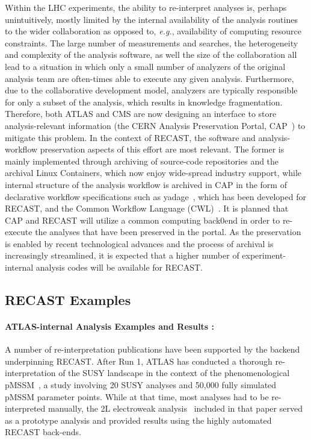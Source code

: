 Within the LHC experiments, the ability to re-interpret analyses is, perhaps unintuitively, mostly limited by the internal availability of the analysis routines to the wider collaboration as opposed to, \emph{e.g.}, availability of computing resource constraints. The large number of measurements and searches, the heterogeneity and complexity of the analysis software, as well the size of the collaboration all lead to a situation in which  only a small number of analyzers of the original analysis team are often-times able to execute any given analysis. Furthermore, due to the collaborative development model, analyzers  are typically responsible for only a subset of the analysis, which results in knowledge fragmentation. Therefore, both ATLAS and CMS are now designing an interface to store analysis-relevant information (the CERN Analysis Preservation Portal, CAP~\cite{CAP}) to mitigate this problem. In the context of RECAST, the software and analysis-workflow preservation aspects of this effort are most relevant. The former is mainly implemented through archiving of source-code repositories and the archival Linux Containers, which now enjoy wide-spread industry support, while internal structure of the analysis workflow is archived in CAP in the form of declarative workflow specifications such as yadage~\cite{Cranmer:2017frf}, which has been developed for RECAST, and the Common Workflow Language (CWL)~\cite{CWL}. It is planned that CAP and RECAST will utilize a common computing back0end in order to re-execute the analyses that have been preserved in the portal. As the preservation is enabled by recent technological advances and the process of archival is increasingly streamlined, it is expected that a higher number of  experiment-internal analysis codes will be available for RECAST.



\subsection{RECAST Examples}

\paragraph{ATLAS-internal Analysis Examples and Results :}

A number of re-interpretation publications have been supported by the backend underpinning RECAST. After Run 1, ATLAS has conducted a thorough re-interpretation of the SUSY landscape in the context of the phenomenological pMSSM~\cite{Aad:2015baa}, a study involving 20 SUSY analyses and 50,000 fully simulated pMSSM parameter points. While at that time, most analyses had to be re-interpreted manually, the 2L electroweak analysis~\cite{Aad:2014vma} included in that paper served as a prototype analysis and provided results using the highly automated RECAST back-ends.

